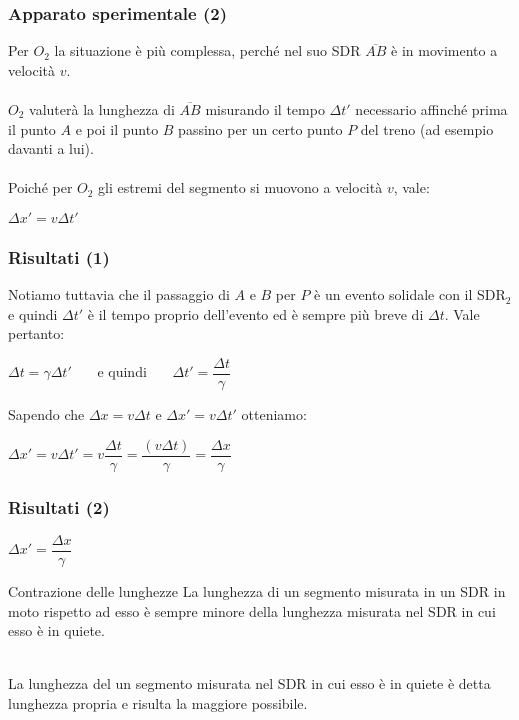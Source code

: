 \documentclass[]{beamer}
\theoremstyle{plain}
\begin{document}
\begin{frame}
  \frametitle{Apparato sperimentale (2)}
  \alert<1>{Per $ O_2 $} la situazione è più complessa, perché nel suo SDR \alert<1>{$ \overline{AB} $ è in movimento a velocità $ v $}.\\~\pause\\  
  $ O_2 $ valuterà la lunghezza di $ \overline{AB} $ misurando il \alert<2>{tempo $ \Delta t' $ necessario affinché prima il punto $ A $ e poi il punto $ B $ passino per un certo punto $ P $ del treno} (ad esempio davanti a lui).\\~\pause\\  
  Poiché per $ O_2 $ gli estremi del segmento si muovono a velocità $ v $, vale:
\begin{center}
\colorbox{blue!30}{$ \Delta x' = v \Delta t' $}
\end{center}
\end{frame}


\begin{frame}
  \frametitle{Risultati (1)}
Notiamo tuttavia che il passaggio di $ A $ e $ B $ per $ P $ è un evento solidale con il SDR$ _2 $ e quindi \alert<1>{$ \Delta t' $ è il tempo proprio dell'evento} ed è sempre più breve di $ \Delta t $. Vale pertanto:
\begin{center}
$ \Delta t = \gamma \Delta t' $~~~ e quindi ~~~$ \Delta t' = \dfrac{\Delta t}{\gamma} $
\end{center}
Sapendo che $ \Delta x = v \Delta t $ e $ \Delta x' = v \Delta t' $ otteniamo:
\begin{center}
$ \Delta x' = v \Delta t' = v \dfrac{\Delta t}{\gamma} = \dfrac{(v \Delta t)}{\gamma} = \dfrac{\Delta x}{\gamma} $
\end{center}
\end{frame}


\begin{frame}
  \frametitle{Risultati (2)}
  \begin{center}
\colorbox{blue!30}{$ \Delta x' = \dfrac{\Delta x}{\gamma} $}
\end{center}\pause
\begin{block}{Contrazione delle lunghezze}
La lunghezza di un segmento misurata in un SDR in moto rispetto ad esso è sempre minore della lunghezza misurata nel SDR in cui esso è in quiete.
\end{block}~\pause\\    
La lunghezza del un segmento misurata nel SDR in cui esso è in quiete è detta \alert{lunghezza propria} e risulta la maggiore possibile.
\end{frame}
\end{document}
